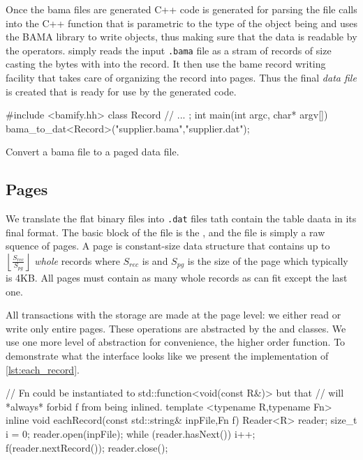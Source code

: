 Once the bama files are generated C++ code is generated for parsing
the file calls into the C++ function  that is parametric
to the type of the object being and uses the BAMA library to write
objects, thus making sure that the data is readable by the
operators.  simply reads the input \texttt{.bama} file as a
stram of records of size  casting the bytes with
 into the record. It then use the bame
record writing facility  that takes care of
organizing the record into pages. Thus the final \emph{data file} is
created that is ready for use by the generated code.

\begin{code}
\begin{cppcode}
#include <bamify.hh>
class Record {
  // ...
};
int main(int argc, char* argv[]) {
  bama_to_dat<Record>("supplier.bama","supplier.dat");
}
\end{cppcode}
  \caption{Convert a bama file to a paged data file.}
\end{code}

\subsection{Pages}

We translate the flat binary files into \texttt{.dat} files tath
contain the table daata in its final format. The basic block of the
file is the , and the file is simply a raw squence of
pages. A page is constant-size data structure that contains up to
\(\left\lfloor\frac{S_{rec}}{S_{pg}} \right\rfloor\) \emph{whole}
records where \(S_{rec}\) is  and \(S_{pg}\) is
the size of the page which typically is 4KB. All pages must contain as
many whole records as can fit except the last one.

All transactions with the storage are made at the page level: we
either read or write only entire pages. These operations are
abstracted by the  and  classes. We use one more level
of abstraction for convenience, the higher order 
function. To demonstrate what the interface looks like we present the
implementation of  \ref{lst:each_record}.

\begin{code}
\begin{cppcode}
// Fn could be instantiated to std::function<void(const R&)> but that
// will *always* forbid f from being inlined.
template <typename R,typename Fn>
inline void eachRecord(const std::string& inpFile,Fn f) {
  Reader<R> reader;
  size_t i = 0;
  reader.open(inpFile);
  while (reader.hasNext()) {
    i++;
    f(reader.nextRecord());
  }
  reader.close();
}
\end{cppcode}
\caption{\label{lst:each_record}}
\end{code}

